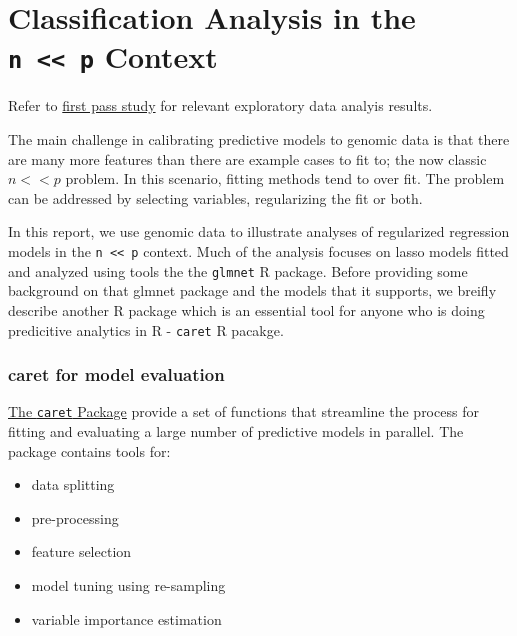 \documentclass[
]{book}
\providecommand{\tightlist}{%
  \setlength{\itemsep}{0pt}\setlength{\parskip}{0pt}}
\begin{document}
\hypertarget{modeling-background}{%
\chapter{\texorpdfstring{Classification Analysis in the \texttt{n\ \textless{}\textless{}\ p} Context}{Classification Analysis in the n \textless\textless{} p Context}}\label{modeling-background}}

Refer to \href{https://hcc-5hmc-analysis.netlify.app/}{first pass study} for
relevant exploratory data analyis results.

The main challenge in calibrating predictive models to genomic data is that
there are many more features than there are example cases to fit to;
the now classic \(n << p\) problem.
In this scenario, fitting methods tend to over fit. The problem
can be addressed by selecting variables, regularizing the fit or both.

In this report, we use genomic data to illustrate analyses of regularized regression
models in the \texttt{n\ \textless{}\textless{}\ p} context. Much of the analysis focuses on lasso models fitted
and analyzed using tools the the \texttt{glmnet} R package. Before providing some background
on that glmnet package and the models that it supports, we breifly describe another R package
which is an essential tool for anyone who is doing predicitive analytics in R - \texttt{caret} R pacakge.

\hypertarget{caret-for-model-evaluation}{%
\subsection{caret for model evaluation}\label{caret-for-model-evaluation}}

\href{https://topepo.github.io/caret/index.html}{The \texttt{caret} Package}
provide a set of functions that streamline the process for fitting and
evaluating a large number of predictive models in parallel. The package contains tools for:

\begin{itemize}
\tightlist
\item
  data splitting\\
\item
  pre-processing\\
\item
  feature selection\\
\item
  model tuning using re-sampling\\
\item
  variable importance estimation
\end{itemize}
\end{document}
